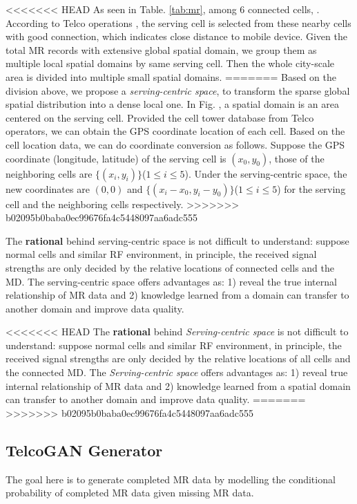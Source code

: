 <<<<<<< HEAD
As seen in Table. \ref{tab:mr}, among 6 connected cells, . According to Telco operations \cite{DBLP:conf/infocom/RayDM16}, the serving cell is selected from these nearby cells with good connection, which indicates close distance to mobile device. Given the total MR records with extensive global spatial domain, we group them as multiple local spatial domains by same serving cell. Then the whole city-scale area is divided into multiple small spatial domains.
=======
Based on the division above, we propose a \emph{serving-centric space}, to transform the sparse global spatial distribution into a dense local one. In Fig. , a spatial domain is an area centered on the serving cell. Provided the cell tower database from Telco operators, we can obtain the GPS coordinate location of each cell. Based on the cell location data, we can do coordinate conversion as follows. Suppose the GPS coordinate (longitude, latitude) of the serving cell is $(x_0,y_0)$, those of the neighboring cells are $\{(x_i,y_i)\}$($1\leq i\leq 5$). Under the serving-centric space, the new coordinates are $(0,0)$ and $\{(x_i-x_0,y_i-y_0)\}$($1\leq i\leq 5$) for the serving cell and the neighboring cells respectively.
>>>>>>> b02095b0baba0ec99676fa4c5448097aa6adc555

The \textbf{rational} behind serving-centric space is not difficult to understand: suppose normal cells and similar RF environment, in principle, the received signal strengths are only decided by the relative locations of connected cells and the MD. The serving-centric space offers advantages as: 1) reveal the true internal relationship of MR data and 2) knowledge learned from a domain can transfer to another domain and improve data quality.

<<<<<<< HEAD
The \textbf{rational} behind \emph{Serving-centric space} is not difficult to understand: suppose normal cells and similar RF environment, in principle, the received signal strengths are only decided by the relative locations of all cells and the connected MD. The \emph{Serving-centric space} offers advantages as: 1) reveal true internal relationship of MR data and 2) knowledge learned from a spatial domain can transfer to another domain and improve data quality.
=======
>>>>>>> b02095b0baba0ec99676fa4c5448097aa6adc555

\subsection{TelcoGAN Generator}
The goal here is to generate completed MR data by modelling the conditional probability of completed MR data given missing MR data.

